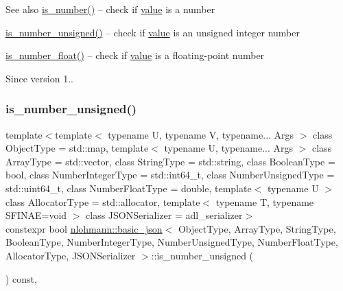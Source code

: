 \begin{DoxySeeAlso}{See also}
\mbox{\hyperlink{classnlohmann_1_1basic__json_a2b9852390abb4b1ef5fac6984e2fc0f3}{is\+\_\+number()}} -- check if \mbox{\hyperlink{classnlohmann_1_1basic__json_adcf8ca5079f5db993820bf50036bf45d}{value}} is a number 

\mbox{\hyperlink{classnlohmann_1_1basic__json_abc7378cba0613a78b9aad1c8e7044bb0}{is\+\_\+number\+\_\+unsigned()}} -- check if \mbox{\hyperlink{classnlohmann_1_1basic__json_adcf8ca5079f5db993820bf50036bf45d}{value}} is an unsigned integer number 

\mbox{\hyperlink{classnlohmann_1_1basic__json_a33b4bf898b857c962e798fc7f6e86e70}{is\+\_\+number\+\_\+float()}} -- check if \mbox{\hyperlink{classnlohmann_1_1basic__json_adcf8ca5079f5db993820bf50036bf45d}{value}} is a floating-\/point number
\end{DoxySeeAlso}
\begin{DoxySince}{Since}
version 1.. 
\end{DoxySince}
\mbox{\label{classnlohmann_1_1basic__json_abc7378cba0613a78b9aad1c8e7044bb0}} 
\subsubsection{\texorpdfstring{is\+\_\+number\+\_\+unsigned()}{is\_number\_unsigned()}}
{\footnotesize\ttfamily template$<$template$<$ typename U, typename V, typename... Args $>$ class Object\+Type = std\+::map, template$<$ typename U, typename... Args $>$ class Array\+Type = std\+::vector, class String\+Type  = std\+::string, class Boolean\+Type  = bool, class Number\+Integer\+Type  = std\+::int64\+\_\+t, class Number\+Unsigned\+Type  = std\+::uint64\+\_\+t, class Number\+Float\+Type  = double, template$<$ typename U $>$ class Allocator\+Type = std\+::allocator, template$<$ typename T, typename S\+F\+I\+N\+A\+E=void $>$ class J\+S\+O\+N\+Serializer = adl\+\_\+serializer$>$ \\
constexpr bool \mbox{\hyperlink{classnlohmann_1_1basic__json}{nlohmann\+::basic\+\_\+json}}$<$ Object\+Type, Array\+Type, String\+Type, Boolean\+Type, Number\+Integer\+Type, Number\+Unsigned\+Type, Number\+Float\+Type, Allocator\+Type, J\+S\+O\+N\+Serializer $>$\+::is\+\_\+number\+\_\+unsigned (\begin{DoxyParamCaption}{ }\end{DoxyParamCaption}) const\hspace{0.3cm}{\ttfamily [inline]}, {\ttfamily [noexcept]}}



